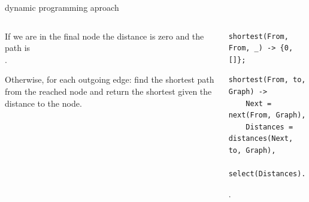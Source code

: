 \begin{frame}[fragile]{dynamic programming aproach}

\begin{columns}
 \begin{column}{0.4\linewidth}
  If we are in the final node the distance is zero and the path is \[\].

  \vspace{10pt}
  Otherwise, for each outgoing edge: find the shortest path from the
  reached node and return the shortest given the distance to the node.

 \end{column}
 \begin{column}{0.6\linewidth}
  \begin{verbatim}
shortest(From, From, _) -> {0, []};
  \end{verbatim}
  \pause
  \begin{verbatim}
shortest(From, to, Graph) ->
    Next = next(From, Graph),
    Distances = distances(Next, to, Graph),
    select(Distances).
  \end{verbatim}
  .
 \end{column}
\end{columns}



\end{frame}

